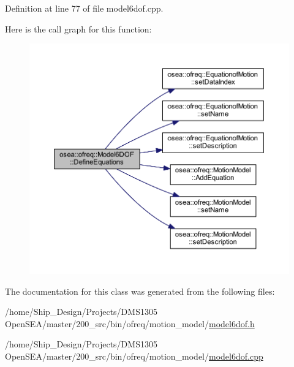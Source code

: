 Definition at line 77 of file model6dof.\-cpp.



Here is the call graph for this function\-:
\nopagebreak
\begin{figure}[H]
\begin{center}
\leavevmode
\includegraphics[width=350pt]{classosea_1_1ofreq_1_1_model6_d_o_f_a0048de3d40838c93e2130ebb5130f3a1_cgraph}
\end{center}
\end{figure}




The documentation for this class was generated from the following files\-:\begin{DoxyCompactItemize}
\item 
/home/\-Ship\-\_\-\-Design/\-Projects/\-D\-M\-S1305 Open\-S\-E\-A/master/200\-\_\-src/bin/ofreq/motion\-\_\-model/\hyperlink{model6dof_8h}{model6dof.\-h}\item 
/home/\-Ship\-\_\-\-Design/\-Projects/\-D\-M\-S1305 Open\-S\-E\-A/master/200\-\_\-src/bin/ofreq/motion\-\_\-model/\hyperlink{model6dof_8cpp}{model6dof.\-cpp}\end{DoxyCompactItemize}
